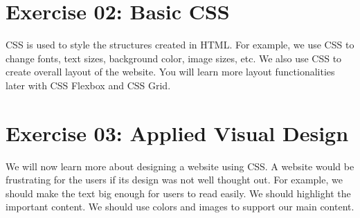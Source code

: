\documentclass{42-en}
\begin{document}

\chapter{Exercise 02: Basic CSS}

\exnumber{\exercicenumber}

\makeheaderfiles

CSS is used to style the structures created in HTML. For example, we use CSS to change fonts, text sizes, background color, image sizes, etc. We also use CSS to create overall layout of the website. You will learn more layout functionalities later with CSS Flexbox and CSS Grid.


\chapter{Exercise 03: Applied Visual Design}

\exnumber{\exercicenumber}

\makeheaderfiles

We will now learn more about designing a website using CSS. A website would be frustrating for the users if its design was not well thought out. For example, we should make the text big enough for users to read easily. We should highlight the important content. We should use colors and images to support our main content.

\end{document}
